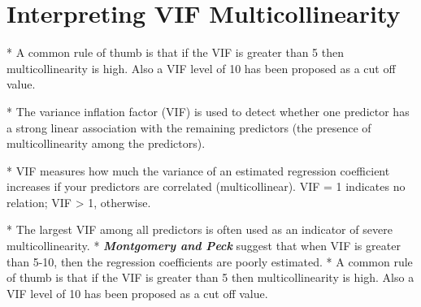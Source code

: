 
\section{Interpreting VIF Multicollinearity}

\begin{itemize}

*  A common rule of thumb is that if the VIF is greater than 5 then multicollinearity is high. Also a VIF level of 10 has been proposed as a cut off value.

*   The variance inflation factor (VIF) is used to detect whether one predictor has a strong linear association
with the remaining predictors (the presence of multicollinearity among the predictors).

*   VIF measures how much the variance of an estimated regression coefficient increases if your predictors
are correlated (multicollinear). VIF = 1 indicates no relation; VIF > 1, otherwise.

*   The largest VIF among all predictors is often used as an indicator of severe multicollinearity.
*   \textbf{\textit{Montgomery and Peck}} suggest that when VIF is greater than 5-10, then the regression coefficients are poorly estimated.
*  A common rule of thumb is that if the VIF is greater than 5 then multicollinearity is high.
Also a VIF level of 10 has been proposed as a cut off value.

\end{itemize}


%
%
%
%








